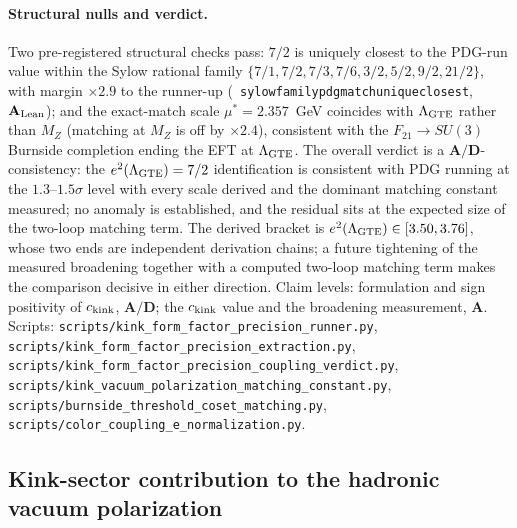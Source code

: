 \documentclass[11pt]{article}
\theoremstyle{remark}
\newcommand{\lean}[1]{%
  \penalty-100
  \begingroup\def\_{\textunderscore\allowbreak}\texttt{#1}\endgroup}
\newcommand{\CatA}{\textbf{A}}
\newcommand{\CatAL}{\ensuremath{\textbf{A}_{\rm Lean}}}
\newcommand{\CatAD}{\textbf{A/D}}
\begin{document}
\paragraph{Structural nulls and verdict.}
Two pre-registered structural checks pass: $7/2$ is uniquely closest to the
PDG-run value within the Sylow rational family $\{7/1, 7/2, 7/3, 7/6, 3/2,
5/2, 9/2, 21/2\}$, with margin $\times2.9$ to the runner-up
\mbox{(\lean{sylow\_family\_pdg\_match\_unique\_closest}, $\CatAL$)}; and the
exact-match scale $\mu^\ast = 2.357$~GeV coincides with $\Lambda_{\rm GTE}$
rather than $M_Z$ (matching at $M_Z$ is off by $\times2.4$), consistent with
the $F_{21}\to SU(3)$ Burnside completion ending the EFT at
$\Lambda_{\rm GTE}$.  The overall verdict is a $\CatAD$-consistency: the
$e^2(\Lambda_{\rm GTE}) = 7/2$ identification is consistent with PDG running
at the $1.3$--$1.5\sigma$ level with every scale derived and the dominant
matching constant measured; no anomaly is established, and the residual sits
at the expected size of the two-loop matching term.  The derived bracket is
$e^2(\Lambda_{\rm GTE}) \in [3.50, 3.76]$, whose two ends are independent
derivation chains; a future tightening of the measured broadening together
with a computed two-loop matching term makes the comparison decisive in
either direction.
Claim levels: formulation and sign positivity of $c_{\rm kink}$, $\CatAD$;
the $c_{\rm kink}$ value and the broadening measurement, $\CatA$.
Scripts: \texttt{scripts/kink\allowbreak\_form\allowbreak\_factor\allowbreak\_precision\allowbreak\_runner.py},
\texttt{scripts/kink\allowbreak\_form\allowbreak\_factor\allowbreak\_precision\allowbreak\_extraction.py},
\texttt{scripts/kink\allowbreak\_form\allowbreak\_factor\allowbreak\_precision\allowbreak\_coupling\allowbreak\_verdict.py},
\texttt{scripts/kink\allowbreak\_vacuum\allowbreak\_polarization\allowbreak\_matching\allowbreak\_constant.py},
\texttt{scripts/burnside\allowbreak\_threshold\allowbreak\_coset\allowbreak\_matching.py},
\texttt{scripts/color\allowbreak\_coupling\allowbreak\_e\allowbreak\_normalization.py}.

\subsection{Kink-sector contribution to the hadronic vacuum polarization}
\label{ssec:kink_hvp}
\end{document}
